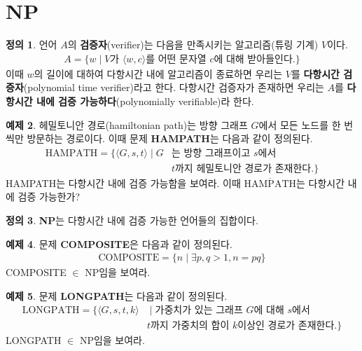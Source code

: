\documentclass[b5paper, 11pt]{book}
\theoremstyle{definition}
\newtheorem{defn}{정의}[chapter]
\newtheorem{ex}[defn]{예제}
\begin{document}
\section{NP}
\begin{defn}
    언어 $A$의 \textbf{검증자}(verifier)는 다음을 만족시키는 알고리즘(튜링 기계) $V$이다.
    \begin{align*}
        A = \{w \;\vert\; V \text{가 } \langle w,c\rangle \text{를 어떤 문자열 } c \text{에 대해 받아들인다.}\}
    \end{align*}
    이때 $w$의 길이에 대하여 다항시간 내에 알고리즘이 종료하면 우리는 $V$를 \textbf{다항시간 검증자}(polynomial time verifier)라고 한다.  다항시간 검증자가 존재하면 우리는 $A$를 \textbf{다항시간 내에 검증 가능하다}(polynomially verifiable)라 한다.
\end{defn}
\begin{ex}
    헤밀토니안 경로(hamiltonian path)는 방향 그래프 $G$에서 모든 노드를 한 번씩만 방문하는 경로이다. 이때 문제 \textbf{HAMPATH}는 다음과 같이 정의된다.
    \begin{align*}
        \text{HAMPATH} = \{\langle G,s,t \rangle \;\vert\; G &\text{는 방향 그래프이고 } s \text{에서 } 
        \\ & t \text{까지 헤밀토니안 경로가 존재한다.}\}
    \end{align*}
    HAMPATH는 다항시간 내에 검증 가능함을 보여라. 이때 $\overline{\text{HAMPATH}}$는 다항시간 내에 검증 가능한가?
\end{ex}
\begin{defn}
    \textbf{NP}는 다항시간 내에 검증 가능한 언어들의 집합이다.
\end{defn}
\begin{ex}
    문제 \textbf{COMPOSITE}은 다음과 같이 정의된다.
    \begin{align*}
        \text{COMPOSITE} = \{n \;\vert\; \exists p,q > 1, n = pq \}
    \end{align*}
    COMPOSITE $\in$ NP임을 보여라.
\end{ex}
\begin{ex}
    문제 \textbf{LONGPATH}는 다음과 같이 정의된다.
    \begin{align*}
    \text{LONGPATH} = \{ \langle G,s, t, k\rangle & \;\vert\; \text{가중치가 있는 그래프 }
      G \text{에 대해 } s \text{에서 } \\ 
    & t \text{까지 가중치의 합이 } k \text{이상인 경로가 존재한다.} \}
    \end{align*}
    LONGPATH $\in $ NP임을 보여라. 
\end{ex}
\end{document}
